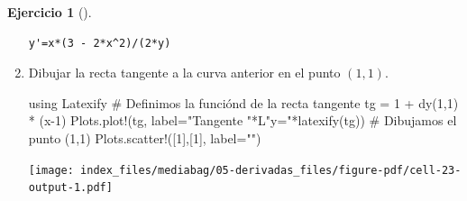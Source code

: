 \documentclass[
  a4paper,
]{scrreport}
\newenvironment{Shaded}{\begin{snugshade}}{\end{snugshade}}
\newcommand{\BuiltInTok}[1]{\textcolor[rgb]{0.00,0.23,0.31}{#1}}
\newcommand{\CommentTok}[1]{\textcolor[rgb]{0.37,0.37,0.37}{#1}}
\newcommand{\FloatTok}[1]{\textcolor[rgb]{0.68,0.00,0.00}{#1}}
\newcommand{\FunctionTok}[1]{\textcolor[rgb]{0.28,0.35,0.67}{#1}}
\newcommand{\ImportTok}[1]{\textcolor[rgb]{0.00,0.46,0.62}{#1}}
\newcommand{\NormalTok}[1]{\textcolor[rgb]{0.00,0.23,0.31}{#1}}
\newcommand{\OperatorTok}[1]{\textcolor[rgb]{0.37,0.37,0.37}{#1}}
\newcommand{\StringTok}[1]{\textcolor[rgb]{0.13,0.47,0.30}{#1}}
\theoremstyle{definition}
\newtheorem{exercise}{Ejercicio}[chapter]
\theoremstyle{remark}
\begin{document}
\begin{exercise}[]
\begin{enumerate}
\begin{tcolorbox}
\begin{verbatim}
y'=x*(3 - 2*x^2)/(2*y)
\end{verbatim}

  \end{tcolorbox}
\item
  Dibujar la recta tangente a la curva anterior en el punto \((1,1)\).

  \begin{tcolorbox}[enhanced jigsaw, bottomtitle=1mm, arc=.35mm, leftrule=.75mm, left=2mm, breakable, colbacktitle=quarto-callout-tip-color!10!white, toprule=.15mm, toptitle=1mm, rightrule=.15mm, opacitybacktitle=0.6, coltitle=black, title=\textcolor{quarto-callout-tip-color}{\faLightbulb}\hspace{0.5em}{Solución}, colframe=quarto-callout-tip-color-frame, colback=white, titlerule=0mm, bottomrule=.15mm, opacityback=0]

\begin{Shaded}
\begin{Highlighting}[]
\ImportTok{using} \BuiltInTok{Latexify}
\CommentTok{\# Definimos la funciónd de la recta tangente}
\NormalTok{tg }\OperatorTok{=} \FloatTok{1} \OperatorTok{+} \FunctionTok{dy}\NormalTok{(}\FloatTok{1}\NormalTok{,}\FloatTok{1}\NormalTok{) }\OperatorTok{*}\NormalTok{ (x}\OperatorTok{{-}}\FloatTok{1}\NormalTok{)}
\NormalTok{Plots.}\FunctionTok{plot!}\NormalTok{(tg, label}\OperatorTok{=}\StringTok{"Tangente "}\OperatorTok{*}\NormalTok{L}\StringTok{"y="}\FunctionTok{*latexify}\NormalTok{(tg))}
\CommentTok{\# Dibujamos el punto (1,1)}
\NormalTok{Plots.}\FunctionTok{scatter!}\NormalTok{([}\FloatTok{1}\NormalTok{],[}\FloatTok{1}\NormalTok{], label}\OperatorTok{=}\StringTok{""}\NormalTok{)}
\end{Highlighting}
\end{Shaded}

  \texttt{[image: index\_files/mediabag/05-derivadas\_files/figure-pdf/cell-23-output-1.pdf]}

  \end{tcolorbox}
\end{enumerate}

\end{exercise}
\end{document}
